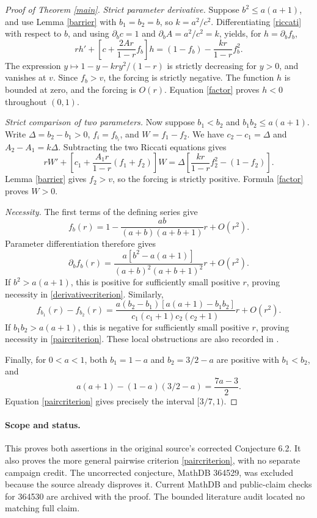 \documentclass[11pt]{article}
\begin{document}
\begin{proof}[Proof of Theorem \ref{main}]
\emph{Strict parameter derivative.}
Suppose \(b^2\le a(a+1)\), and use Lemma \ref{barrier}
with \(b_1=b_2=b\), so \(k=a^2/c^2\).
Differentiating \eqref{riccati} with respect to \(b\), and using
\(\partial_b c=1\) and \(\partial_b A=a^2/c^2=k\), yields,
for \(h=\partial_b f_b\),
\[
 rh'+\left[c+\frac{2Ar}{1-r}f_b\right]h
 =(1-f_b)-\frac{kr}{1-r}f_b^2 .
\]
The expression \(y\mapsto 1-y-kr y^2/(1-r)\) is strictly
decreasing for \(y>0\), and vanishes at \(v\).
Since \(f_b>v\), the forcing is strictly negative.
The function \(h\) is bounded at zero, and the forcing is \(O(r)\).
Equation \eqref{factor} proves \(h<0\) throughout \((0,1)\).

\emph{Strict comparison of two parameters.}
Now suppose \(b_1<b_2\) and \(b_1b_2\le a(a+1)\).
Write \(\Delta=b_2-b_1>0\), \(f_i=f_{b_i}\), and
\(W=f_1-f_2\). We have \(c_2-c_1=\Delta\) and
\(A_2-A_1=k\Delta\). Subtracting the two Riccati equations gives
\[
 rW'+\left[c_1+\frac{A_1r}{1-r}(f_1+f_2)\right]W
 =\Delta\left[\frac{kr}{1-r}f_2^2-(1-f_2)\right].
\]
Lemma \ref{barrier} gives \(f_2>v\), so the forcing is strictly
positive. Formula \eqref{factor} proves \(W>0\).

\emph{Necessity.}
The first terms of the defining series give
\[
 f_b(r)=1-\frac{ab}{(a+b)(a+b+1)}r+O(r^2).
\]
Parameter differentiation therefore gives
\[
 \partial_b f_b(r)=
 \frac{a[b^2-a(a+1)]}{(a+b)^2(a+b+1)^2}r+O(r^2).
\]
If \(b^2>a(a+1)\), this is positive for sufficiently small positive
\(r\), proving necessity in \eqref{derivativecriterion}.
Similarly,
\[
 f_{b_1}(r)-f_{b_2}(r)
 =\frac{a(b_2-b_1)[a(a+1)-b_1b_2]}
 {c_1(c_1+1)c_2(c_2+1)}r+O(r^2).
\]
If \(b_1b_2>a(a+1)\), this is negative for sufficiently small
positive \(r\), proving necessity in \eqref{paircriterion}.
These local obstructions are also recorded in \cite{Q}.

Finally, for \(0<a<1\), both \(b_1=1-a\) and \(b_2=3/2-a\)
are positive with \(b_1<b_2\), and
\[
 a(a+1)-(1-a)(3/2-a)=\frac{7a-3}{2}.
\]
Equation \eqref{paircriterion} gives precisely the interval
\([3/7,1)\).
\end{proof}

\paragraph{Scope and status.}
This proves both assertions in the original source's corrected
Conjecture 6.2. It also proves the more general pairwise criterion
\eqref{paircriterion}, with no separate campaign credit.
The uncorrected conjecture, MathDB 364529, was excluded because the
source already disproves it.
Current MathDB and public-claim checks for 364530 are archived with
the proof. The bounded literature audit located no matching full claim.
\end{document}
